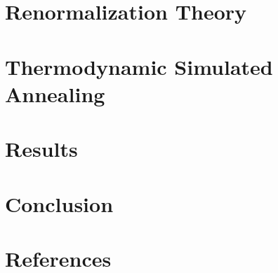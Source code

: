 \documentclass[twocolumn]{article}
\begin{document}
\section{Renormalization Theory}
\section{Thermodynamic Simulated Annealing}
\section{Results}
\section{Conclusion}
\section{References}
\end{document}
